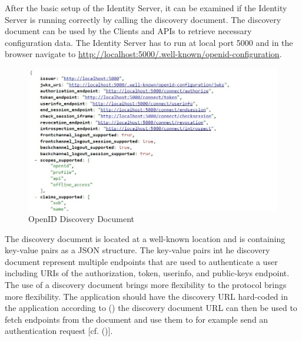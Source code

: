 After the basic setup of the Identity Server, it can be examined if the Identity Server is running correctly by calling the discovery document. The discovery document can be used by the Clients and APIs to retrieve necessary configuration data. The Identity Server has to run at local port 5000 and in the browser navigate to
\url{http://localhost:5000/.well-known/openid-configuration}.

\begin{figure}[h]
	\centering
	\includegraphics[width=0.8\linewidth]{images/openid-discovery-document}
	\caption{OpenID Discovery Document}
	\label{fig:openid-discovery-document}
\end{figure}
The discovery document is located at a well-known location and is containing key-value pairs as a JSON structure. The key-value pairs int he discovery document represent multiple endpoints that are used to authenticate a user including URIs of the authorization, token, userinfo, and public-keys endpoint. The use of a discovery document brings more flexibility to the protocol brings more flexibility. The application should have the discovery URL hard-coded in the application according to (\cite{Google:2018:IdentityPlatform}) the discovery document URL can then be used to fetch endpoints from the document and use them to for example send an authentication request [cf. (\cite{Google:2018:IdentityPlatform})].

